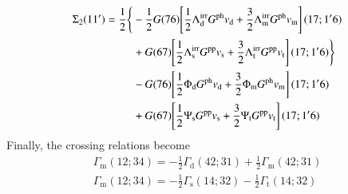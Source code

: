 \documentclass[aip,jcp,reprint,noshowkeys,superscriptaddress]{revtex4-1}
\newcommand{\ph}{\text{ph}}
\newcommand{\pp}{\text{pp}}
\newcommand{\irr}{\text{irr}}
\begin{document}
\begin{equation}
\label{eq:Sig2_sa}
\begin{split}
	\Sigma_2(11') 
	= \frac{1}{2} \Bigg\{ 
	& - \frac{1}{2} G(76) \qty[ 
	\frac{1}{2} \Lambda_\text{d}^\irr G^\ph v_\text{d} + \frac{3}{2} \Lambda_\text{m}^\irr G^\ph v_\text{m} ](17;1'6) 
	\\
	& + G(67) \qty[ \frac{1}{2} \Lambda_\text{s}^\irr G^\pp v_\text{s} + \frac{3}{2} \Lambda_\text{t}^\irr G^\pp v_\text{t} ](17;1'6)
	\Bigg\}
	\\
	& - G(76) \qty[ \frac{1}{2} \Phi_\text{d} G^\ph v_\text{d} + \frac{3}{2} \Phi_\text{m} G^\ph v_\text{m} ](17;1'6)
	\\
	& + G(67) \qty[ \frac{1}{2} \Psi_\text{s} G^\pp v_\text{s} + \frac{3}{2} \Psi_\text{t} G^\pp v_\text{t} ](17;1'6)
\end{split}
\end{equation}
Finally, the crossing relations become
\begin{gather}
	\Gamma_\text{m}(12;34) = - \frac{1}{2} \Gamma_\text{d}(42;31) + \frac{1}{2} \Gamma_\text{m}(42;31)
	\\
	\Gamma_\text{m}(12;34) = - \frac{1}{2} \Gamma_\text{s}(14;32) - \frac{1}{2} \Gamma_\text{t}(14;32)
\end{gather}

\end{document}
